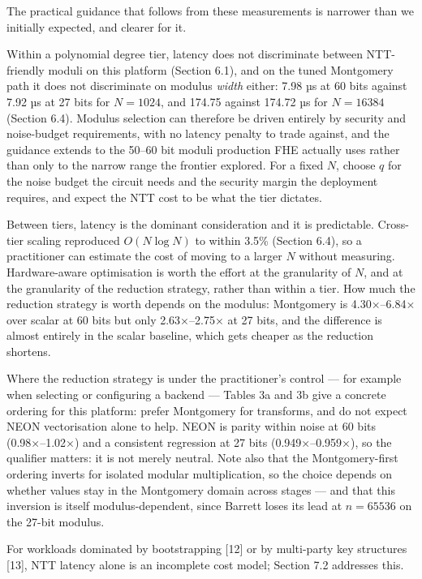 The practical guidance that follows from these measurements is narrower than we initially expected, and clearer for it.

Within a polynomial degree tier, latency does not discriminate between NTT-friendly moduli on this platform (Section 6.1), and on the tuned Montgomery path it does not discriminate on modulus \emph{width} either: 7.98 µs at 60 bits against 7.92 µs at 27 bits for \(N = 1024\), and 174.75 against 174.72 µs for \(N = 16384\) (Section 6.4). Modulus selection can therefore be driven entirely by security and noise-budget requirements, with no latency penalty to trade against, and the guidance extends to the 50--60 bit moduli production FHE actually uses rather than only to the narrow range the frontier explored. For a fixed \(N\), choose \(q\) for the noise budget the circuit needs and the security margin the deployment requires, and expect the NTT cost to be what the tier dictates.

Between tiers, latency is the dominant consideration and it is predictable. Cross-tier scaling reproduced \(O(N \log N)\) to within 3.5\% (Section 6.4), so a practitioner can estimate the cost of moving to a larger \(N\) without measuring. Hardware-aware optimisation is worth the effort at the granularity of \(N\), and at the granularity of the reduction strategy, rather than within a tier. How much the reduction strategy is worth depends on the modulus: Montgomery is 4.30×--6.84× over scalar at 60 bits but only 2.63×--2.75× at 27 bits, and the difference is almost entirely in the scalar baseline, which gets cheaper as the reduction shortens.

Where the reduction strategy is under the practitioner's control --- for example when selecting or configuring a backend --- Tables 3a and 3b give a concrete ordering for this platform: prefer Montgomery for transforms, and do not expect NEON vectorisation alone to help. NEON is parity within noise at 60 bits (0.98×--1.02×) and a consistent regression at 27 bits (0.949×--0.959×), so the qualifier matters: it is not merely neutral. Note also that the Montgomery-first ordering inverts for isolated modular multiplication, so the choice depends on whether values stay in the Montgomery domain across stages --- and that this inversion is itself modulus-dependent, since Barrett loses its lead at \(n = 65536\) on the 27-bit modulus.

For workloads dominated by bootstrapping [12] or by multi-party key structures [13], NTT latency alone is an incomplete cost model; Section 7.2 addresses this.


